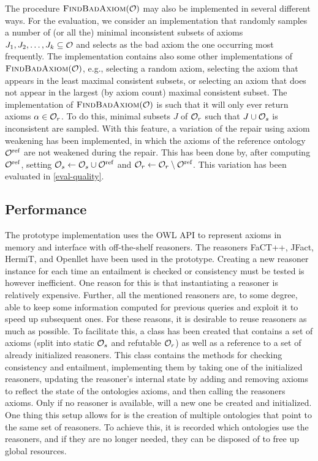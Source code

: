 The procedure $\textsc{FindBadAxiom}(\mathcal{O})$ may also be implemented in several different ways. For the evaluation, we consider an implementation that randomly samples a number of (or all the) minimal inconsistent subsets of axioms $J_1, J_2, \dots, J_k \subseteq \mathcal{O}$ and selects as the bad axiom the one occurring most frequently. The implementation contains also some other implementations of $\textsc{FindBadAxiom}(\mathcal{O})$, e.g., selecting a random axiom, selecting the axiom that appears in the least maximal consistent subsets, or selecting an axiom that does not appear in the largest (by axiom count) maximal consistent subset. The implementation of $\textsc{FindBadAxiom}(\mathcal{O})$ is such that it will only ever return axioms $\alpha \in \mathcal{O}_r$. To do this, minimal subsets $J$ of $\mathcal{O}_r$ such that $J \cup \mathcal{O}_s$ is inconsistent are sampled. With this feature, a variation of the repair using axiom weakening has been implemented, in which the axioms of the reference ontology ${\mathcal{O}^\textnormal{ref}}$ are not weakened during the repair. This has been done by, after computing ${\mathcal{O}^\textnormal{ref}}$, setting $\mathcal{O}_s \gets \mathcal{O}_s \cup {\mathcal{O}^\textnormal{ref}}$ and $\mathcal{O}_r \gets \mathcal{O}_r \setminus {\mathcal{O}^\textnormal{ref}}$. This variation has been evaluated in \cref{eval-quality}.

\subsection{Performance}\label{performance-impl}

The prototype implementation uses the OWL API \cite{horridge2011owl,owlapi} to represent axioms in memory and interface with off-the-shelf reasoners. The reasoners FaCT++, JFact, HermiT, and Openllet have been used in the prototype. Creating a new reasoner instance for each time an entailment is checked or consistency must be tested is however inefficient. One reason for this is that instantiating a reasoner is relatively expensive. Further, all the mentioned reasoners are, to some degree, able to keep some information computed for previous queries and exploit it to speed up subsequent ones. For these reasons, it is desirable to reuse reasoners as much as possible. To facilitate this, a class  has been created that contains a set of axioms (split into static $\mathcal{O}_s$ and refutable $\mathcal{O}_r$) as well as a reference to a set of already initialized reasoners. This class contains the methods for checking consistency and entailment, implementing them by taking one of the initialized reasoners, updating the reasoner's internal state by adding and removing axioms to reflect the state of the ontologies axioms, and then calling the reasoners axioms. Only if no reasoner is available, will a new one be created and initialized. One thing this setup allows for is the creation of multiple ontologies that point to the same set of reasoners. To achieve this, it is recorded which ontologies use the reasoners, and if they are no longer needed, they can be disposed of to free up global resources.

